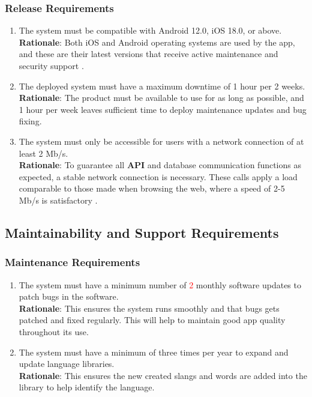 \subsubsection{Release Requirements}
\label{ssub:release_requirements}
\begin{enumerate}[{OE-R}1. ]
	\item The system must be compatible with Android 12.0, iOS 18.0, or above.
	\\ \textbf{Rationale}: Both iOS and Android operating systems are used by the app, and these are their latest versions that receive active maintenance and security support \cite{EndOfLife2025_Android,EndOfLife2025_iOS}. 
	\item The deployed system must have a maximum downtime of 1 hour per 2 weeks.
	\\ \textbf{Rationale}: The product must be available to use for as long as possible, and 1 hour per week leaves sufficient time to deploy maintenance updates and bug fixing.
	\item The system must only be accessible for users with a network connection of at least 2 Mb/s.
	\\ \textbf{Rationale}: To guarantee all \textbf{API} and database communication functions as expected, a stable network connection is necessary. These calls apply a load comparable to those made when browsing the web, where a speed of 2-5 Mb/s is satisfactory \cite{Speedtest2025}.
\end{enumerate}


\subsection{Maintainability and Support Requirements}
\label{sub:maintainability_and_support_requirements}

\subsubsection{Maintenance Requirements}
\label{ssub:maintenance_requirements}
\begin{enumerate}[{MS-M}1. ]
	\item The system must have a minimum number of \textcolor{red}{2} monthly software updates to patch bugs in the software.  
	\\ \textbf{Rationale}: This ensures the system runs smoothly and that bugs gets patched and fixed regularly. This will help to maintain 	good app quality throughout its use.
	\item The system must have a minimum of three times per year to expand and update language libraries. 
	\\ \textbf{Rationale}: This ensures the new created slangs and words are added into the library to help identify the language.
\end{enumerate}

